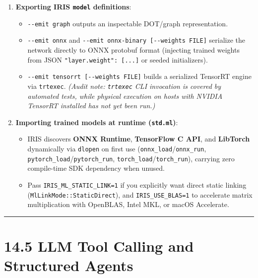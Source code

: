 \documentclass[
  english,
  oneside]{book}
\providecommand{\tightlist}{%
  \setlength{\itemsep}{0pt}\setlength{\parskip}{0pt}}
\begin{document}
\begin{enumerate}
\def\labelenumi{\arabic{enumi}.}
\tightlist
\item
  \textbf{Exporting IRIS \texttt{model} definitions}:

  \begin{itemize}
  \tightlist
  \item
    \texttt{-\/-emit\ graph} outputs an inspectable DOT/graph
    representation.
  \item
    \texttt{-\/-emit\ onnx} and
    \texttt{-\/-emit\ onnx-binary\ {[}-\/-weights\ FILE{]}} serialize
    the network directly to ONNX protobuf format (injecting trained
    weights from JSON \texttt{"layer.weight":\ {[}...{]}} or seeded
    initializers).
  \item
    \texttt{-\/-emit\ tensorrt\ {[}-\/-weights\ FILE{]}} builds a
    serialized TensorRT engine via \texttt{trtexec}. \emph{(Audit note:
    \texttt{trtexec} CLI invocation is covered by automated tests, while
    physical execution on hosts with NVIDIA TensorRT installed has not
    yet been run.)}
  \end{itemize}
\item
  \textbf{Importing trained models at runtime (\texttt{std.ml})}:

  \begin{itemize}
  \tightlist
  \item
    IRIS discovers \textbf{ONNX Runtime}, \textbf{TensorFlow C API}, and
    \textbf{LibTorch} dynamically via \texttt{dlopen} on first use
    (\texttt{onnx\_load}/\texttt{onnx\_run},
    \texttt{pytorch\_load}/\texttt{pytorch\_run},
    \texttt{torch\_load}/\texttt{torch\_run}), carrying zero
    compile-time SDK dependency when unused.
  \item
    Pass \texttt{IRIS\_ML\_STATIC\_LINK=1} if you explicitly want direct
    static linking (\texttt{MlLinkMode::StaticDirect}), and
    \texttt{IRIS\_USE\_BLAS=1} to accelerate matrix multiplication with
    OpenBLAS, Intel MKL, or macOS Accelerate.
  \end{itemize}
\end{enumerate}

\begin{center}\rule{0.5\linewidth}{0.5pt}\end{center}

\section{14.5 LLM Tool Calling and Structured
Agents}\label{llm-tool-calling-and-structured-agents}
\end{document}
